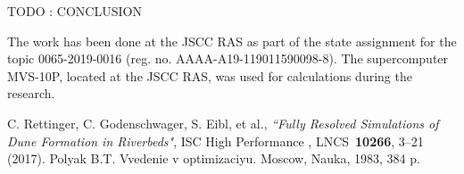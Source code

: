 \documentclass[
11pt,%
tightenlines,%
twoside,%
onecolumn,%
nofloats,%
nobibnotes,%
nofootinbib,%
superscriptaddress,%
noshowpacs,%
centertags]%
{revtex4}
\begin{document}
TODO : CONCLUSION

\begin{acknowledgments}
The work has been done at the JSCC RAS as part of the state assignment for the topic 0065-2019-0016 (reg. no. AAAA-A19-119011590098-8). The supercomputer MVS-10P, located at the JSCC RAS, was used for calculations during the research.
\end{acknowledgments}

\begin{thebibliography}{99}


C. Rettinger, C. Godenschwager, S. Eibl, et al., {\it ``Fully Resolved Simulations of Dune Formation in Riverbeds"}, ISC High Performance , LNCS~{\bf 10266}, 3--21 (2017).
Polyak B.T. Vvedenie v optimizaciyu. Moscow, Nauka, 1983, 384 p.

\end{thebibliography}
\end{document}
